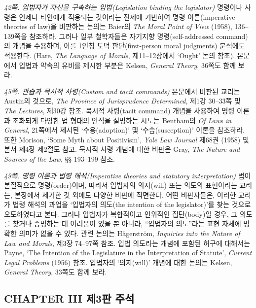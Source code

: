 \documentclass[12pt, oneside]{book}  %
\begin{document}
\emph{42쪽. 입법자가 자신을 구속하는 입법(Legislation binding the
legislator)} 명령이나 사령은 언제나 타인에게 적용되는 것이라는 전제에
기반하여 명령 이론(imperative theories of law)을 비판하는 논의는 Baier의
\emph{The Moral Point of View} (1958), 136--139쪽을 참조하라. 그러나
일부 철학자들은 자기지향 명령(self-addressed command)의 개념을 수용하며,
이를 1인칭 도덕 판단(first-person moral judgments) 분석에도 적용한다.
(Hare, \emph{The Language of Morals}, 제11--12장에서 `Ought' 논의 참조).
본문에서 입법과 약속의 유비를 제시한 부분은 Kelsen, \emph{General
Theory}, 36쪽도 함께 보라.

\emph{45쪽. 관습과 묵시적 사령(Custom and tacit commands)} 본문에서
비판된 교리는 Austin의 것으로, \emph{The Province of Jurisprudence
Determined}, 제1강 30--33쪽 및 \emph{The Lectures}, 제30강 참조. 묵시적
사령(tacit command) 개념을 사용하여 명령 이론과 조화되게 다양한 법
형태의 인식을 설명하는 시도는 Bentham의 \emph{Of Laws in General},
21쪽에서 제시된 `수용(adoption)' 및 `수습(susception)' 이론을 참조하라.
또한 Morison, `Some Myth about Positivism', \emph{Yale Law Journal}
제68권 (1958) 및 본서 제4장 제2절도 참고. 묵시적 사령 개념에 대한 비판은
Gray, \emph{The Nature and Sources of the Law}, §§ 193--199 참조.

\emph{49쪽. 명령 이론과 법령 해석(Imperative theories and statutory
interpretation)} 법이 본질적으로 명령(order)이며, 따라서 입법자의
의지(will) 또는 의도의 표현이라는 교리는, 본장에서 제기한 것 외에도
다양한 비판에 직면한다. 어떤 비판자들은, 이러한 교리가 법령 해석의
과업을 `입법자의 의도(the intention of the legislator)'를 찾는 것으로
오도하였다고 본다. 그러나 입법자가 복합적이고 인위적인 집단(body)일
경우, 그 의도를 찾거나 증명하는 데 어려움이 있을 뿐 아니라, ``입법자의
의도''라는 표현 자체에 명확한 의미가 없을 수 있다. 관련 논의는
Hägerström, \emph{Inquiries into the Nature of Law and Morals}, 제3장
74--97쪽 참조. 입법 의도라는 개념에 포함된 허구에 대해서는 Payne, `The
Intention of the Legislature in the Interpretation of Statute',
\emph{Current Legal Problems} (1956) 참조. 입법자의 `의지(will)' 개념에
대한 논의는 Kelsen, \emph{General Theory}, 33쪽도 함께 보라.

\subsection{\texorpdfstring{\textbf{CHAPTER III 제3판
주석}}{CHAPTER III 제3판 주석}}\label{chapter-iii-uxc81c3uxd310-uxc8fcuxc11d}
\end{document}
